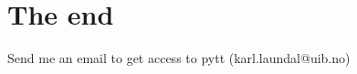 \documentclass[11pt]{article}
\begin{document}
    \begin{center}
    \end{center}
    { \hspace*{\fill} \\}
    
    

    \hypertarget{the-end}{%
\section{The end}\label{the-end}}

Send me an email to get access to pytt (karl.laundal@uib.no)


    
    
    
    
\end{document}
